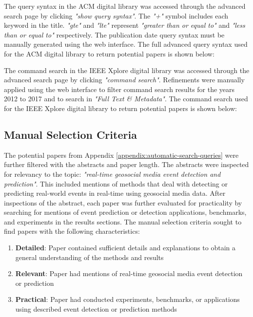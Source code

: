 The query syntax in the ACM digital library was accessed through the advanced search page by clicking \textit{"show query syntax"}. The \textit{"+"} symbol includes each keyword in the title. \textit{"gte"} and \textit{"lte"} represent \textit{"greater than or equal to"} and \textit{"less than or equal to"} respectively. The publication date query syntax must be manually generated using the web interface. The full advanced query syntax used for the ACM digital library to return potential papers is shown below:



The command search in the IEEE Xplore digital library was accessed through the advanced search page by clicking \textit{"command search"}. Refinements were manually applied using the web interface to filter command search results for the years 2012 to 2017 and to search in \textit{"Full Text \& Metadata"}. The command search used for the IEEE Xplore digital library to return potential papers is shown below:



\subsection{Manual Selection Criteria} \label{appendix:manual-selection-criteria}

The potential papers from Appendix \ref{appendix:automatic-search-queries} were further filtered with the abstracts and paper length. The abstracts were inspected for relevancy to the topic: \textit{"real-time geosocial media event detection and prediction"}. This included mentions of methods that deal with detecting or predicting real-world events in real-time using geosocial media data. After inspections of the abstract, each paper was further evaluated for practicality by searching for mentions of event prediction or detection applications, benchmarks, and experiments in the results sections. The manual selection criteria sought to find papers with the following characteristics:

\begin{enumerate}[label=(\alph*)]
	\item \textbf{Detailed}: Paper contained sufficient details and explanations to obtain a general understanding of the methods and results
	\item \textbf{Relevant}: Paper had mentions of real-time geosocial media event detection or prediction
	\item \textbf{Practical}: Paper had conducted experiments, benchmarks, or applications using described event detection or prediction methods
\end{enumerate}

